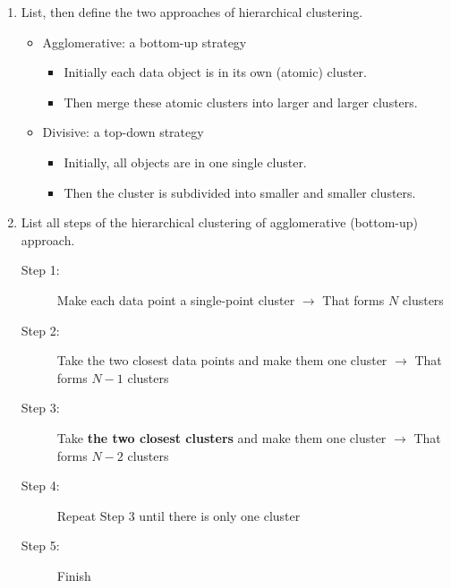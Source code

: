 \documentclass[12pt]{article}
\newenvironment{QandA}{\begin{enumerate}[label=\bfseries\arabic*.]\bfseries}
{\end{enumerate}}
\newenvironment{answered}{\par\normalfont\color{Sepia}}{}
\begin{document}
\begin{QandA}
    \item List, then define the two approaches of hierarchical clustering.
    \begin{answered}
        \begin{itemize}
            \item Agglomerative: a bottom-up strategy
            \begin{itemize}
                \item Initially each data object is in its own (atomic) cluster.
                \item Then merge these atomic clusters into larger and larger clusters.
            \end{itemize}
            \item Divisive: a top-down strategy
            \begin{itemize}
                \item Initially, all objects are in one single cluster.
                \item Then the cluster is subdivided into smaller and smaller clusters.
            \end{itemize}
        \end{itemize}
    \end{answered}

    \item List all steps of the hierarchical clustering of agglomerative (bottom-up) approach.
    \begin{answered}
        \begin{description}
            \item[Step 1:] Make each data point a single-point cluster $\rightarrow$ That forms $N$ clusters
            \item[Step 2:] Take the two closest data points and make them one cluster $\rightarrow$ That forms $N - 1$ clusters 
            \item[Step 3:] Take \textbf{the two closest clusters} and make them one cluster $\rightarrow$ That forms $N - 2$ clusters
            \item[Step 4:] Repeat Step 3 until there is only one cluster
            \item[Step 5:] Finish
        \end{description}
    \end{answered}


\end{QandA}
\end{document}
